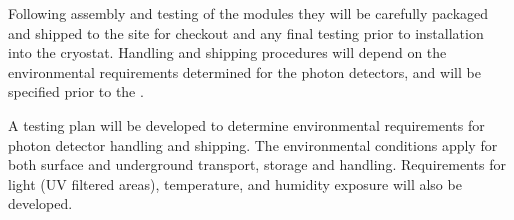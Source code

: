 






Following assembly and testing of the  modules they will be carefully packaged and shipped to the  site for checkout and any final testing prior to installation into the cryostat. Handling and shipping procedures will depend on the environmental requirements determined for the photon detectors, and will be specified prior to the .

A testing plan will be developed to determine environmental requirements for photon detector handling and shipping. The environmental conditions apply for both surface and underground transport, storage and handling. Requirements for light (UV filtered areas), temperature, and humidity exposure will also be developed.

